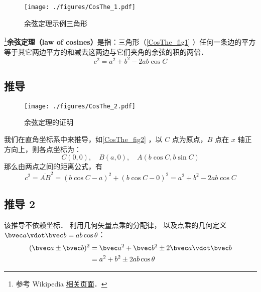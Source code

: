 
\begin{figure}[ht]
\centering
\texttt{[image: ./figures/CosThe\_1.pdf]}
\caption{余弦定理示例三角形} \label{CosThe_fig1}
\end{figure}

\footnote{参考 Wikipedia \href{https://en.wikipedia.org/wiki/Law_of_cosines}{相关页面}．}\textbf{余弦定理（law of cosines）}是指：三角形（\autoref{CosThe_fig1} ）任何一条边的平方等于其它两边平方的和减去这两边与它们夹角的余弦的积的两倍．
\begin{equation}\label{CosThe_eq1}
c^2=a^2 + b^2 - 2ab\cos C
\end{equation}


\subsection{推导}
\begin{figure}[ht]
\centering
\texttt{[image: ./figures/CosThe\_2.pdf]}
\caption{余弦定理的证明} \label{CosThe_fig2}
\end{figure}
我们在直角坐标系中来推导，如\autoref{CosThe_fig2} ，以 $C$ 点为原点，$B$ 点在 $x$ 轴正方向上，则各点坐标为：
\begin{equation}
C(0,0),\quad B(a,0),\quad A(b\cos C,b\sin C)
\end{equation}
那么由两点之间的距离公式，有
\begin{equation}
c^2=\overline{AB}^2=(b\cos C-a)^2+(b\cos C-0)^2=a^2+b^2-2ab\cos C
\end{equation}

\subsection{推导 2}
该推导不依赖坐标． 利用几何矢量点乘的分配律， 以及点乘的几何定义 $\bvec a \vdot \bvec b = ab\cos\theta$：
\begin{equation}\label{CosThe_eq2}
\begin{aligned}
(\bvec a \pm \bvec b)^2 &= \bvec a^2 + \bvec b^2 \pm 2\bvec a \vdot \bvec b\\
&= a^2 + b^2 \pm 2ab \cos\theta
\end{aligned}
\end{equation}
